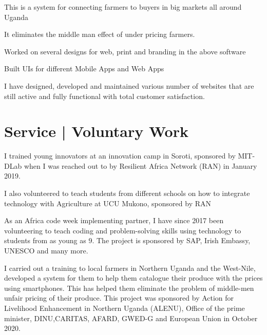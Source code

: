 \documentclass[]{plushcv}
\begin{document}
\begin{tightemize}
\item This is a system for connecting farmers to buyers in big markets all around Uganda  
\item It eliminates the middle man effect of under pricing farmers.
\end{tightemize}
\sectionsep

\begin{tightemize}
 \item Worked on several designs for web, print and branding in the above software
 \item Built UIs for different Mobile Apps and Web Apps
\end{tightemize}
\sectionsep

\begin{tightemize}
\item I have designed, developed and maintained various number of websites that are still active and fully functional with total customer satisfaction.
\end{tightemize}
\sectionsep

\section{Service | Voluntary Work}
\begin{tightemize}
\item I trained young innovators at an innovation camp in Soroti, sponsored by MIT-DLab when I was reached out to by Resilient Africa Network (RAN) in January 2019.
\item I also volunteered to teach students from different schools on how to integrate technology with Agriculture at UCU Mukono, sponsored by RAN
\item As an Africa code week implementing partner, I have since 2017 been volunteering to teach coding and problem-solving skills using technology to students from as young as 9. The project is sponsored by SAP, Irish Embassy, UNESCO and many more.
\item I carried out a training to local farmers in Northern Uganda and the West-Nile, developed a system for them to help them catalogue their produce with the prices using smartphones. This has helped them eliminate the problem of middle-men unfair pricing of their produce. This project was sponsored by Action for Livelihood Enhancement in Northern Uganda (ALENU), Office of the prime minister, DINU,CARITAS, AFARD, GWED-G and European Union in October 2020.
\end{tightemize}
\end{document}
